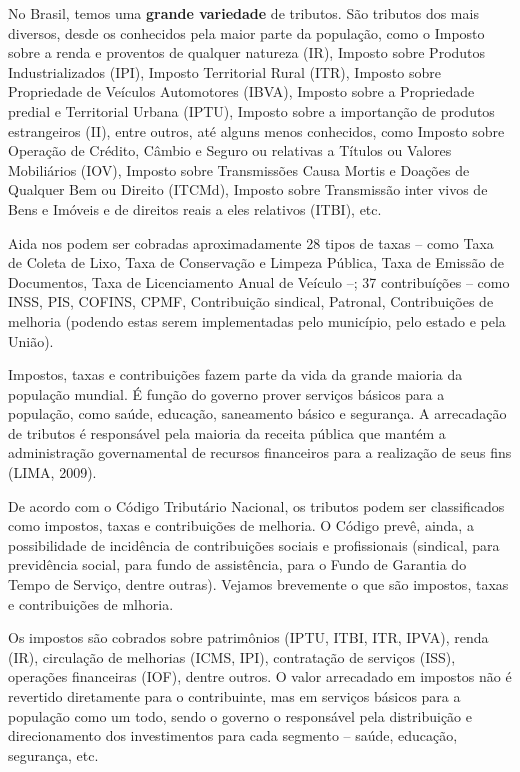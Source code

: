 \begin{knowledge}
No Brasil, temos uma \textbf{grande variedade} de tributos. São tributos dos mais diversos, desde os conhecidos pela maior parte da população, como o Imposto sobre a renda e proventos de qualquer natureza (IR), Imposto sobre Produtos Industrializados (IPI), Imposto Territorial Rural (ITR), Imposto sobre Propriedade de Veículos Automotores (IBVA), Imposto sobre a Propriedade predial e Territorial Urbana (IPTU), Imposto sobre a importanção de produtos estrangeiros (II), entre outros, até alguns menos conhecidos, como Imposto sobre Operação de Crédito, Câmbio e Seguro ou relativas a Títulos ou Valores Mobiliários (IOV), Imposto sobre Transmissões Causa Mortis e Doações de Qualquer Bem ou Direito (ITCMd), Imposto sobre Transmissão inter vivos de Bens e Imóveis e de direitos reais a eles relativos (ITBI), etc.

Aida nos podem ser cobradas aproximadamente 28 tipos de taxas -- como Taxa de Coleta de Lixo, Taxa de Conservação e Limpeza Pública, Taxa de Emissão de Documentos, Taxa de Licenciamento Anual de Veículo --; 37 contribuíções -- como INSS, PIS, COFINS, CPMF, Contribuição sindical, Patronal, Contribuições de melhoria (podendo estas serem implementadas pelo município, pelo estado e pela União).
\end{knowledge}

\label{fin-arg-8}

Impostos, taxas e contribuições fazem parte da vida da grande maioria da população mundial. É função do governo prover serviços básicos para a população, como saúde, educação, saneamento básico e segurança. A arrecadação de tributos é responsável pela maioria da receita pública que mantém a administração governamental de recursos financeiros para a realização de seus fins (LIMA, 2009).

De acordo com o Código Tributário Nacional, os tributos podem ser classificados como impostos, taxas e contribuições de melhoria. O Código prevê, ainda, a possibilidade de incidência de contribuições sociais e profissionais (sindical, para previdência social, para fundo de assistência, para o Fundo de Garantia do Tempo de Serviço, dentre outras). Vejamos brevemente o que são impostos, taxas e contribuições de mlhoria.

Os impostos são cobrados sobre patrimônios (IPTU, ITBI, ITR, IPVA), renda (IR), circulação de melhorias (ICMS, IPI), contratação de serviços (ISS), operações financeiras (IOF), dentre outros. O valor arrecadado em impostos não é revertido diretamente para o contribuinte, mas em serviços básicos para a população como um todo, sendo o governo o responsável pela distribuição e direcionamento dos investimentos para cada segmento -- saúde, educação, segurança, etc.

